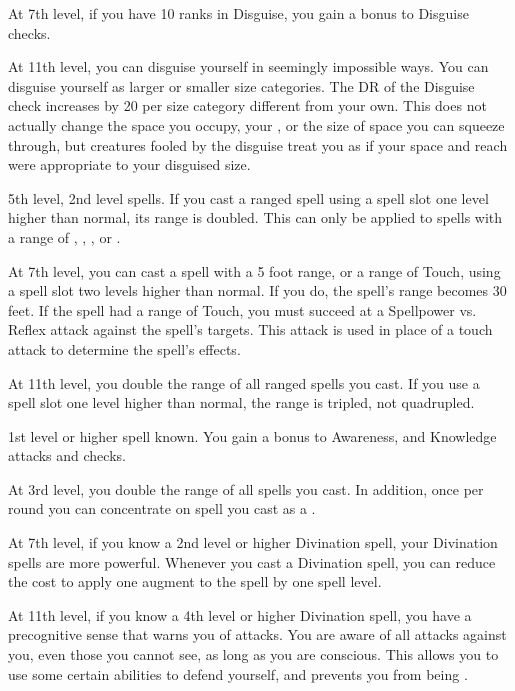     At 7th level, if you have 10 ranks in Disguise, you gain a  bonus to Disguise checks.

    At 11th level, you can disguise yourself in seemingly impossible ways.
    You can disguise yourself as larger or smaller size categories.
    The DR of the Disguise check increases by 20 per size category different from your own.
    This does not actually change the space you occupy, your , or the size of space you can squeeze through, but creatures fooled by the disguise treat you as if your space and reach were appropriate to your disguised size.
    \magical

    \featpre 5th level, 2nd level spells.
    \featben If you cast a ranged spell using a spell slot one level higher than normal, its range is doubled.
    This can only be applied to spells with a range of \rngclose, \rngmed, \rnglong, or \rngext.

    At 7th level, you can cast a spell with a 5 foot range, or a range of Touch, using a spell slot two levels higher than normal.
    If you do, the spell's range becomes 30 feet.
    If the spell had a range of Touch, you must succeed at a Spellpower vs. Reflex attack against the spell's targets.
    This attack is used in place of a touch attack to determine the spell's effects.

    At 11th level, you double the range of all ranged spells you cast.
    If you use a spell slot one level higher than normal, the range is tripled, not quadrupled.

    \featpre 1st level or higher  spell known.
    \featben You gain a  bonus to Awareness, and Knowledge attacks and checks.

    At 3rd level, you double the range of all  spells you cast.
    In addition, once per round you can concentrate on  spell you cast as a .

    At 7th level, if you know a 2nd level or higher Divination spell, your Divination spells are more powerful.
    Whenever you cast a Divination spell, you can reduce the cost to apply one augment to the spell by one spell level.

    At 11th level, if you know a 4th level or higher Divination spell, you have a precognitive sense that warns you of attacks.
    You are aware of all attacks against you, even those you cannot see, as long as you are conscious.
    This allows you to use some certain abilities to defend yourself, and prevents you from being \unaware.

